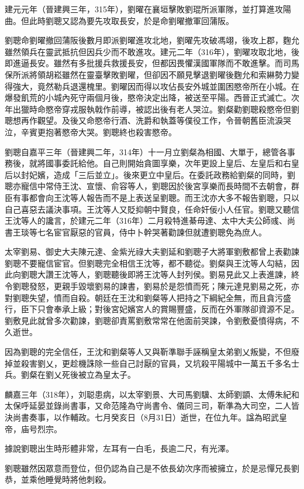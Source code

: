 建元元年（晉建興三年，315年），劉曜在襄垣擊敗劉琨所派軍隊，並打算進攻陽曲。但此時劉聰又認為要先攻取長安，於是命劉曜撤軍回蒲阪。

劉聰命劉曜撤回蒲阪後數月即派劉曜進攻北地，劉曜先攻破馮翊，後攻上郡，麴允雖然領兵在靈武抵抗但因兵少而不敢進攻。建元二年（316年），劉曜攻取北地，後即進逼長安。雖然有多批援兵救援長安，但都因畏懼漢國軍隊而不敢進擊。而司馬保所派將領胡崧雖然在靈臺擊敗劉曜，但卻因不願見擊退劉曜後麴允和索綝勢力變得強大，竟然勒兵退還槐里。劉曜因而得以攻佔長安外城並圍困愍帝所在小城。在爆發飢荒的小城內死守兩個月後，愍帝決定出降，被送至平陽。西晉正式滅亡。次年出獵時命愍帝穿戎服執戟作前導，被認出後有老人哭泣。劉粲勸劉聰殺愍帝但劉聰想再作觀望。及後又命愍帝行酒、洗爵和執蓋等僕役工作，令晉朝舊臣流淚哭泣，辛賓更抱著愍帝大哭。劉聰終也殺害愍帝。

劉聰自嘉平三年（晉建興二年，314年）十一月立劉粲為相國、大單于，總管各事務後，就將國事委託給他。自己則開始貪圖享樂，次年更設上皇后、左皇后和右皇后以封妃嬪，造成「三后並立」。後來更立中皇后。在委託政務給劉粲的同時，劉聰亦寵信中常侍王沈、宣懷、俞容等人，劉聰因於後宮享樂而長時間不去朝會，群臣有事都會向王沈等人報告而不是上表送呈劉聰。而王沈亦大多不報告劉聰，只以自己喜惡去議決事項。王沈等人又貶抑朝中賢良，任命奸佞小人任官。劉聰又聽信王沈等人的讒言，於建元二年（316年）二月殺特進綦毋達、太中大夫公師彧、尚書王琰等七名宦官厭惡的官員，侍中卜幹哭著勸諫但就遭劉聰免為庶人。

太宰劉易、御史大夫陳元達、金紫光祿大夫劉延和劉聰子大將軍劉敷都曾上表勸諫劉聰不要寵信宦官。但劉聰完全相信王沈等，都不聽從。劉粲與王沈等人勾結，因此向劉聰大讚王沈等人，劉聰聽後即將王沈等人封列侯。劉易見此又上表進諫，終令劉聰發怒，更親手毀壞劉易的諫書，劉易於是怨憤而死；陳元達見劉易之死，亦對劉聰失望，憤而自殺。朝廷在王沈和劉粲等人把持之下綱紀全無，而且貪污盛行，臣下只會奉承上級；對後宮妃嬪宮人的賞賜豐盛，反而在外軍隊卻資源不足。劉敷見此就曾多次勸諫，劉聰卻責罵劉敷常常在他面前哭諫，令劉敷憂憤得病，不久逝世。

因為劉聰的完全信任，王沈和劉粲等人又與靳準聯手誣稱皇太弟劉乂叛變，不但廢掉並殺害劉乂，更趁機誅除一些自己討厭的官員，又坑殺平陽城中一萬五千多名士兵。劉粲在劉乂死後被立為皇太子。

麟嘉三年（318年），刘聪患病，以太宰劉景、大司馬劉驥、太師劉顗、太傅朱紀和太保呼延晏並錄尚書事，又命范隆為守尚書令、儀同三司，靳準為大司空，二人皆決尚書奏事，以作輔政。七月癸亥日（8月31日）逝世，在位九年。諡為昭武皇帝，庙号烈宗。

據說劉聰出生時形體非常，左耳有一白毛，長逾二尺，有光澤。

劉聰雖然因眾意而登位，但仍認為自己是不依長幼次序而被擁立，於是忌憚兄長劉恭，並乘他睡覺時將他刺殺。

